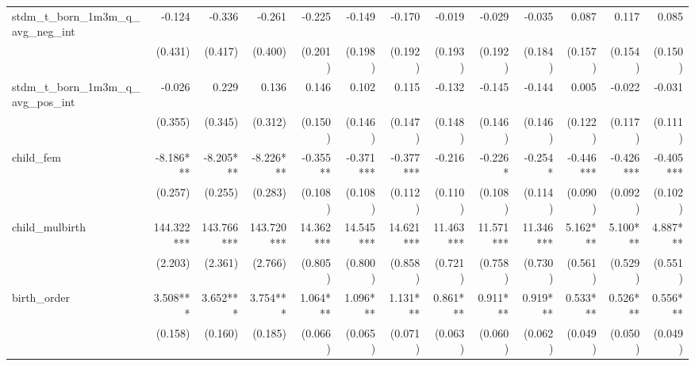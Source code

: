 \begin{tabular}{lrrrrrrrrrrrr}
stdm\_t\_born\_1m3m\_q\_avg\_neg\_int       &       -0.124 &       -0.336 &       -0.261 &       -0.225 &       -0.149 &       -0.170 &       -0.019 &       -0.029 &       -0.035 &        0.087 &        0.117 &        0.085 \\ 
                                            &      (0.431) &      (0.417) &      (0.400) &      (0.201) &      (0.198) &      (0.192) &      (0.193) &      (0.192) &      (0.184) &      (0.157) &      (0.154) &      (0.150) \\ 
stdm\_t\_born\_1m3m\_q\_avg\_pos\_int       &       -0.026 &        0.229 &        0.136 &        0.146 &        0.102 &        0.115 &       -0.132 &       -0.145 &       -0.144 &        0.005 &       -0.022 &       -0.031 \\ 
                                            &      (0.355) &      (0.345) &      (0.312) &      (0.150) &      (0.146) &      (0.147) &      (0.148) &      (0.146) &      (0.146) &      (0.122) &      (0.117) &      (0.111) \\ 
child\_fem                                  &    -8.186*** &    -8.205*** &    -8.226*** &     -0.355** &    -0.371*** &    -0.377*** &       -0.216 &      -0.226* &      -0.254* &    -0.446*** &    -0.426*** &    -0.405*** \\ 
                                            &      (0.257) &      (0.255) &      (0.283) &      (0.108) &      (0.108) &      (0.112) &      (0.110) &      (0.108) &      (0.114) &      (0.090) &      (0.092) &      (0.102) \\ 
child\_mulbirth                             &   144.322*** &   143.766*** &   143.720*** &    14.362*** &    14.545*** &    14.621*** &    11.463*** &    11.571*** &    11.346*** &     5.162*** &     5.100*** &     4.887*** \\ 
                                            &      (2.203) &      (2.361) &      (2.766) &      (0.805) &      (0.800) &      (0.858) &      (0.721) &      (0.758) &      (0.730) &      (0.561) &      (0.529) &      (0.551) \\ 
birth\_order                                &     3.508*** &     3.652*** &     3.754*** &     1.064*** &     1.096*** &     1.131*** &     0.861*** &     0.911*** &     0.919*** &     0.533*** &     0.526*** &     0.556*** \\ 
                                            &      (0.158) &      (0.160) &      (0.185) &      (0.066) &      (0.065) &      (0.071) &      (0.063) &      (0.060) &      (0.062) &      (0.049) &      (0.050) &      (0.049) \\ 

\end{tabular}
